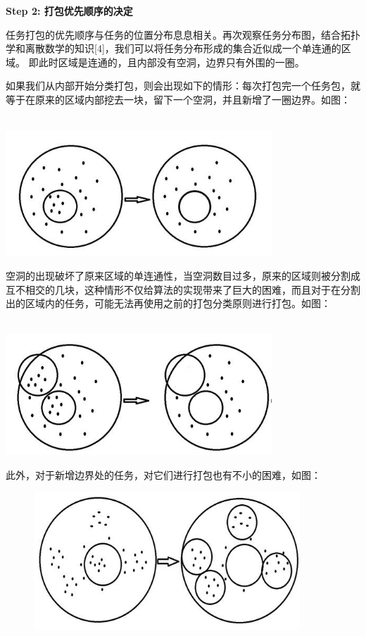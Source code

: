 \documentclass{ctexart}
\begin{document}
\textbf{Step 2: 打包优先顺序的决定}

任务打包的优先顺序与任务的位置分布息息相关。再次观察任务分布图，结合拓扑学和离散数学的知识[4]，我们可以将任务分布形成的集合近似成一个单连通的区域。
即此时区域是连通的，且内部没有空洞，边界只有外围的一圈。

如果我们从内部开始分类打包，则会出现如下的情形：每次打包完一个任务包，就等于在原来的区域内部挖去一块，留下一个空洞，并且新增了一圈边界。如图：

 \ \ \ \ \ \ \  \ \ \  \ \ \ \ \ \ \  \ \ \  \  \includegraphics[width=10cm]{13.jpg}

 空洞的出现破坏了原来区域的单连通性，当空洞数目过多，原来的区域则被分割成互不相交的几块，这种情形不仅给算法的实现带来了巨大的困难，而且对于在分割出的区域内的任务，可能无法再使用之前的打包分类原则进行打包。如图：

  \ \ \ \ \ \ \  \ \ \  \ \ \ \ \ \ \  \ \ \  \ \includegraphics[width=10cm]{14.jpg}

 此外，对于新增边界处的任务，对它们进行打包也有不小的困难，如图：

\begin{figure}\center
\includegraphics[width=10cm]{15.jpg}
\end{figure}
\end{document}
